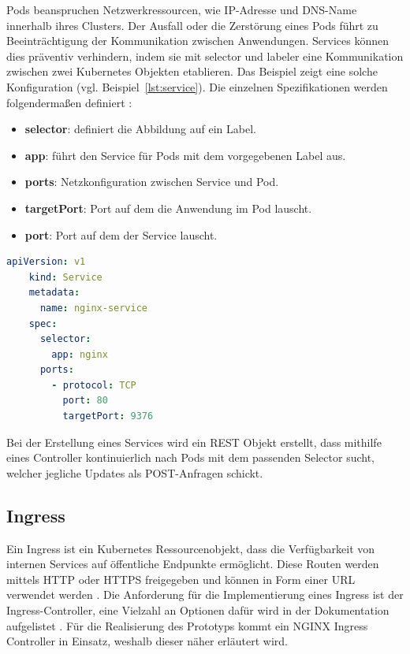 Pods beanspruchen Netzwerkressourcen, wie IP-Adresse und DNS-Name 
innerhalb ihres Clusters. Der Ausfall oder die Zerstörung eines Pods führt zu Beeinträchtigung der Kommunikation
zwischen Anwendungen. Services können dies präventiv verhindern, indem sie mit
selector und labeler eine Kommunikation zwischen zwei Kubernetes Objekten etablieren.
Das Beispiel zeigt eine solche Konfiguration (vgl. Beispiel~\ref{lst:service}). 
Die einzelnen Spezifikationen werden folgendermaßen definiert \cite{kubernetesservice}:

\begin{itemize}
  \item \textbf{selector}: definiert die Abbildung auf ein Label.
  \item \textbf{app}: führt den Service für Pods mit dem vorgegebenen Label aus.
  \item \textbf{ports}: Netzkonfiguration zwischen Service und Pod.
  \item \textbf{targetPort}: Port auf dem die Anwendung im Pod lauscht.
  \item \textbf{port}: Port auf dem der Service lauscht.
\end{itemize}

\begin{lstlisting}[caption={service.yaml \cite{kubernetesservice} },captionpos=b,label={lst:service},language=yaml]
    apiVersion: v1
    kind: Service
    metadata:
      name: nginx-service
    spec:
      selector:
        app: nginx
      ports:
        - protocol: TCP
          port: 80
          targetPort: 9376
    \end{lstlisting}

Bei der Erstellung eines Services wird ein REST Objekt erstellt, dass mithilfe eines Controller kontinuierlich 
nach Pods mit dem passenden Selector sucht, welcher jegliche Updates als POST-Anfragen schickt.


\subsection{Ingress}

Ein Ingress ist ein Kubernetes Ressourcenobjekt, dass die Verfügbarkeit von internen Services auf öffentliche Endpunkte ermöglicht.
Diese Routen werden mittels HTTP oder HTTPS freigegeben und können in Form einer URL verwendet werden \cite{kubernetesingress}.
Die Anforderung für die Implementierung eines Ingress ist der Ingress-Controller, eine Vielzahl an Optionen dafür wird in der 
Dokumentation aufgelistet \cite{kubernetesingresscontroller}. Für die Realisierung des Prototyps kommt ein NGINX Ingress Controller in Einsatz, weshalb
dieser näher erläutert wird.

